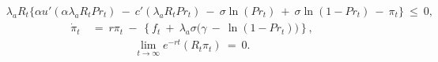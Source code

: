 \begin{equation}
\begin{split}
    & \lambda_{a} R_{t} \big\{ \alpha u'(\alpha \lambda_{a} R_{t} Pr_{t}) \ - \ c'(\lambda_{a} R_{t} Pr_{t}) \ - \ \sigma \ln(Pr_{t}) \ + \ \sigma \ln(1 - Pr_{t}) \ - \ \pi_{t} \big\} \ \leq \ 0,
\end{split}
\label{Equation:Social-Planners-Problem_Necessary-Conditions_Drilling-Probability}
\end{equation}
\begin{equation}
\begin{split}
    \dot{\pi}_{t} \ 
    & = \ r \pi_{t} \ - \ \left\{ f_{t} \ + \ \lambda_{a} \sigma \big( \gamma \ - \ \ln(1 - Pr_{t}) \big) \right\},
\end{split}
\label{Equation:Social-Planners-Problem_Necessary-Conditions_Costate-Variable}
\end{equation}
\begin{equation}
\begin{split}
    \lim_{t \rightarrow \infty} e^{-rt} (R_{t} \pi_{t}) \ = \ 0.
\end{split}
\label{Equation:Social-Planners-Problem_Transversality-Condition}
\end{equation}